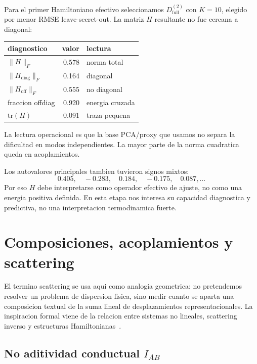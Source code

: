 \documentclass[10pt,twocolumn]{article}
\begin{document}
Para el primer Hamiltoniano efectivo seleccionamos \(D^{(2)}_{\mathrm{full}}\) con \(K=10\), elegido por menor RMSE leave-secret-out. La matriz \(H\) resultante no fue cercana a diagonal:

\begin{center}
\scriptsize
\begin{tabular}{@{}lrl@{}}
\toprule
diagnostico & valor & lectura \\
\midrule
\(\|H\|_F\) & 0.578 & norma total \\
\(\|H_{\mathrm{diag}}\|_F\) & 0.164 & diagonal \\
\(\|H_{\mathrm{off}}\|_F\) & 0.555 & no diagonal \\
fraccion offdiag & 0.920 & energia cruzada \\
\(\mathrm{tr}(H)\) & 0.091 & traza pequena \\
\bottomrule
\end{tabular}
\end{center}

La lectura operacional es que la base PCA/proxy que usamos no separa la dificultad en modos independientes. La mayor parte de la norma cuadratica queda en acoplamientos. 


Los autovalores principales tambien tuvieron signos mixtos:
\[
0.405,\quad -0.283,\quad 0.184,\quad -0.175,\quad 0.087,\ldots
\]
Por eso \(H\) debe interpretarse como operador efectivo de ajuste, no como una energia positiva definida. En esta etapa nos interesa su capacidad diagnostica y predictiva, no una interpretacion termodinamica fuerte.

\section{Composiciones, acoplamientos y scattering}

El termino scattering se usa aqui como analogia geometrica: no pretendemos resolver un problema de dispersion fisica, sino medir cuanto se aparta una composicion textual de la suma lineal de desplazamientos representacionales. La inspiracion formal viene de la relacion entre sistemas no lineales, scattering inverso y estructuras Hamiltonianas~\cite{zakharov1972exact,faddeev2007hamiltonian}.


\subsection{No aditividad conductual \texorpdfstring{\(I_{AB}\)}{IAB}}
\end{document}

